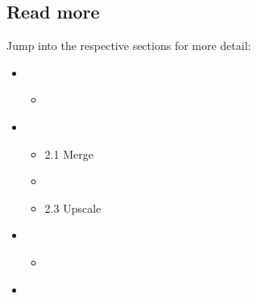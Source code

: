 \documentclass[letterpaper,10pt,english]{sphinxmanual}
\begin{document}
\subsection{Read more}
\label{\detokenize{Notebooks/Examples:Read-more}}
Jump into the respective sections for more detail:
\begin{itemize}
\item {} 
\begin{itemize}
\item {} 
{\hyperref[\detokenize{Notebooks/1.Download/1.Retrieve::doc}]{}}

\end{itemize}

\item {} 
\begin{itemize}
\item {} 
2.1 Merge

\item {} 

\item {} 
2.3 Upscale

\end{itemize}

\item {} 
\begin{itemize}
\item {} 
{\hyperref[\detokenize{Notebooks/3.Evaluate/3.Evaluate::doc}]{}}

\end{itemize}

\item {} 

\end{itemize}

{
\begin{sphinxVerbatim}[commandchars=\\\{\}]
\llap{\color{nbsphinxin}[ ]:\,\hspace{\fboxrule}\hspace{\fboxsep}}
\end{sphinxVerbatim}
}
\end{document}
